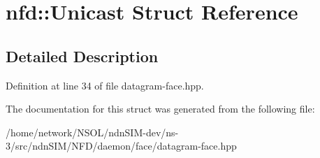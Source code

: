 \hypertarget{structnfd_1_1Unicast}{}\section{nfd\+:\+:Unicast Struct Reference}
\label{structnfd_1_1Unicast}


\subsection{Detailed Description}


Definition at line 34 of file datagram-\/face.\+hpp.



The documentation for this struct was generated from the following file\+:\begin{DoxyCompactItemize}
\item 
/home/network/\+N\+S\+O\+L/ndn\+S\+I\+M-\/dev/ns-\/3/src/ndn\+S\+I\+M/\+N\+F\+D/daemon/face/datagram-\/face.\+hpp\end{DoxyCompactItemize}
